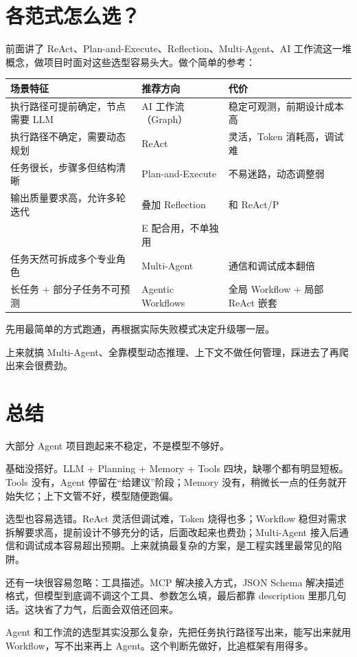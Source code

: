 \documentclass[10pt,a4paper]{ctexart}
\begin{document}
\section{各范式怎么选？}


前面讲了 ReAct、Plan-and-Execute、Reflection、Multi-Agent、AI 工作流这一堆概念，做项目时面对这些选型容易头大。做个简单的参考：


{\footnotesize
\begin{tabularx}{\textwidth}{|X|X|X|}
\hline
\textbf{场景特征} & \textbf{推荐方向} & \textbf{代价} \\
\hline
执行路径可提前确定，节点需要 LLM & AI 工作流（Graph） & 稳定可观测，前期设计成本高 \\
\hline
执行路径不确定，需要动态规划 & ReAct & 灵活，Token 消耗高，调试难 \\
\hline
任务很长，步骤多但结构清晰 & Plan-and-Execute & 不易迷路，动态调整弱 \\
\hline
输出质量要求高，允许多轮迭代 & 叠加 Reflection & 和 ReAct/P\\&E 配合用，不单独用 \\
\hline
任务天然可拆成多个专业角色 & Multi-Agent & 通信和调试成本翻倍 \\
\hline
长任务 + 部分子任务不可预测 & Agentic Workflows & 全局 Workflow + 局部 ReAct 嵌套 \\
\hline
\end{tabularx}
}



先用最简单的方式跑通，再根据实际失败模式决定升级哪一层。



上来就搞 Multi-Agent、全靠模型动态推理、上下文不做任何管理，踩进去了再爬出来会很费劲。



\section{总结}


大部分 Agent 项目跑起来不稳定，不是模型不够好。



基础没搭好。LLM + Planning + Memory + Tools 四块，缺哪个都有明显短板。Tools 没有，Agent 停留在“给建议”阶段；Memory 没有，稍微长一点的任务就开始失忆；上下文管不好，模型随便跑偏。



选型也容易选错。ReAct 灵活但调试难，Token 烧得也多；Workflow 稳但对需求拆解要求高，提前设计不够充分的话，后面改起来也费劲；Multi-Agent 接入后通信和调试成本容易超出预期。上来就搞最复杂的方案，是工程实践里最常见的陷阱。



还有一块很容易忽略：工具描述。MCP 解决接入方式，JSON Schema 解决描述格式，但模型到底调不调这个工具、参数怎么填，最后都靠 description 里那几句话。这块省了力气，后面会双倍还回来。



Agent 和工作流的选型其实没那么复杂，先把任务执行路径写出来，能写出来就用 Workflow，写不出来再上 Agent。这个判断先做好，比追框架有用得多。
\end{document}
